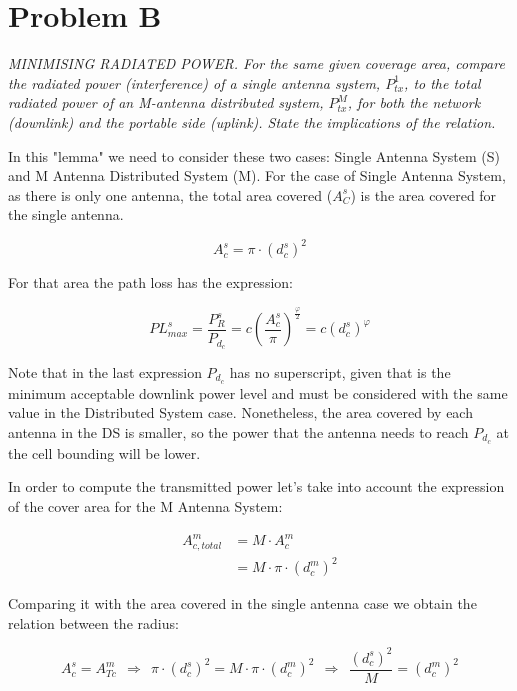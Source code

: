 \section{Problem B}

\textit{MINIMISING RADIATED POWER. For the same given coverage area, compare the radiated power (interference) of a single antenna system, $P_{tx}^1$, to the total radiated power of an M-antenna distributed system, $P_{tx}^M$, for both the network (downlink) and the portable side (uplink). State the implications of the relation.}

In this "lemma" we need to consider these two cases: Single Antenna System (S) and M Antenna Distributed System (M).
For the case of Single Antenna System, as there is only one antenna, the total area covered ($A^s_C$) is the area covered for the single antenna.

\begin{equation}
A^s_c = \pi \cdot (d^s_{c})^2
\end{equation}

For that area the path loss has the expression:

\begin{equation}
PL^s_{max} = \dfrac{P^s_{R}}{P_{d_{c}}} = c\left(\dfrac{A^s_c}{\pi}\right)^{\frac{\varphi}{2}}= c\left(d^s_c\right) ^{\varphi}
\end{equation}

Note that in the last expression $P_{d_{c}}$ has no superscript, given that is the minimum acceptable downlink power level and must be considered with the same value in the Distributed System case. Nonetheless, the area covered by each antenna in the DS is smaller, so the power that the antenna needs to reach $P_{d_{c}}$ at the cell bounding will be lower.

In order to compute the transmitted power let's take into account the expression of the cover area for the M Antenna System:

\begin{align*}
A^m_{c,total} &= M \cdot A^m_{c} \\
&= M \cdot \pi \cdot (d^m_{c})^{2}
\end{align*}


Comparing it with the area covered in the single antenna case we obtain the relation between the radius:

\begin{equation}
A^s_{c}= A^m_{Tc}\ \ \Longrightarrow \ \ \pi \cdot (d^s_{c})^2 = M \cdot \pi \cdot (d^m_{c})^2 \ \  \Longrightarrow \ \
\frac{(d^s_{c})^2}{M} = (d^m_{c})^2
\end{equation}



